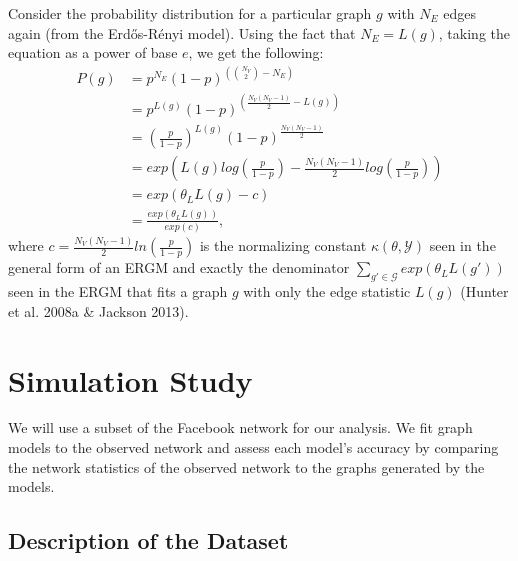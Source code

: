 \documentclass[12pt,twoside]{amherstthesis}
\begin{document}
  Consider the probability distribution for a particular graph \(g\) with
  \(N_E\) edges again (from the Erdős-Rényi model). Using the fact that
  \(N_{E} = L(g)\), taking the equation as a power of base \(e\), we get
  the following: \[
  \begin{aligned}
  P(g) &= p^{N_E}(1 - p)^{\left({N_V \choose 2} - N_E \right)} \\
  &= p^{L(g)}(1 - p)^{\left(\frac {N_{V}(N_{V} - 1)} {2} - L(g) \right)} \\
  &= \left( \frac {p} {1-p} \right)^{L(g)}(1 - p)^{\frac {N_{V}(N_{V} - 1)} {2}} \\
  &= exp \left(L(g)log \left(\frac {p} {1-p} \right) - \frac {N_{V}(N_{V} - 1)} {2} log \left( \frac {p} {1-p} \right) \right) \\
  &= exp(\theta_{L}L(g) - c) \\
  &= \frac {exp(\theta_{L}L(g))} {exp(c)},
  \end{aligned} 
  \] where
  \(c = \frac {N_{V}(N_{V} - 1)} {2} ln \left( \frac {p} {1-p} \right)\)
  is the normalizing constant \(\kappa(\theta, \mathcal{Y})\) seen in the
  general form of an ERGM and exactly the denominator
  \(\sum_{g' \in \mathcal{G}}^{} exp(\theta_{L}L(g'))\) seen in the ERGM
  that fits a graph \(g\) with only the edge statistic \(L(g)\) (Hunter et
  al. 2008a \& Jackson 2013).
  
  \chapter{Simulation Study}\label{simulation-study}
  
  We will use a subset of the Facebook network for our analysis. We fit
  graph models to the observed network and assess each model's accuracy by
  comparing the network statistics of the observed network to the graphs
  generated by the models.
  
  \section{Description of the Dataset}\label{description-of-the-dataset}
  
\end{document}
